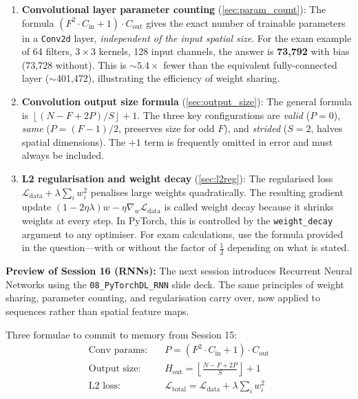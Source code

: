 \documentclass[12pt,a4paper]{article}
\newcommand{\Cin}{C_{\mathrm{in}}}
\newcommand{\Cout}{C_{\mathrm{out}}}
\newcommand{\Ltotal}{\mathcal{L}_{\mathrm{total}}}
\newcommand{\Ldata}{\mathcal{L}_{\mathrm{data}}}
\newcommand{\floor}[1]{\left\lfloor #1 \right\rfloor}
\begin{document}
\begin{enumerate}[label=\textbf{(\arabic*)}, leftmargin=2em]

  \item \textbf{Convolutional layer parameter counting}
    (\cref{sec:param_count}): The formula
    $(F^2 \cdot \Cin + 1) \cdot \Cout$ gives the exact number of trainable
    parameters in a \texttt{Conv2d} layer, \emph{independent of the input
    spatial size}. For the exam example of 64 filters, $3\times3$ kernels,
    128 input channels, the answer is \textbf{73,792} with bias (73,728
    without). This is $\sim$$5.4\times$ fewer than the equivalent fully-connected
    layer ($\sim$401,472), illustrating the efficiency of weight sharing.

  \item \textbf{Convolution output size formula}
    (\cref{sec:output_size}): The general formula is
    $\floor{(N - F + 2P)/S} + 1$. The three key configurations are
    \emph{valid} ($P=0$), \emph{same} ($P=(F{-}1)/2$, preserves size for
    odd $F$), and \emph{strided} ($S=2$, halves spatial dimensions). The
    $+1$ term is frequently omitted in error and must always be included.

  \item \textbf{L2 regularisation and weight decay}
    (\cref{sec:l2reg}): The regularised loss
    $\Ldata + \lambda\sum_i w_i^2$ penalises large weights quadratically.
    The resulting gradient update $(1 - 2\eta\lambda)w -
    \eta\nabla_w\Ldata$ is called weight decay because it shrinks weights
    at every step. In PyTorch, this is controlled by the
    \texttt{weight\_decay} argument to any optimiser. For exam calculations,
    use the formula provided in the question---with or without the factor of
    $\tfrac{1}{2}$ depending on what is stated.

\end{enumerate}

\medskip

\noindent
\textbf{Preview of Session 16 (RNNs):}
The next session introduces Recurrent Neural Networks using the
\texttt{08\_PyTorchDL\_RNN} slide deck. The same principles of weight
sharing, parameter counting, and regularisation carry over, now applied
to sequences rather than spatial feature maps.

\begin{keyinsight}
Three formulae to commit to memory from Session 15:
\begin{align*}
  \text{Conv params:}\quad
    & P = (F^2 \cdot \Cin + 1) \cdot \Cout \\
  \text{Output size:}\quad
    & H_{\mathrm{out}} = \floor{\frac{N - F + 2P}{S}} + 1 \\
  \text{L2 loss:}\quad
    & \Ltotal = \Ldata + \lambda\sum_i w_i^2
\end{align*}
\end{keyinsight}
\end{document}
